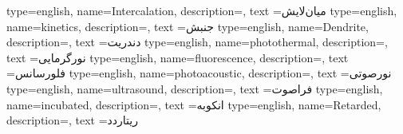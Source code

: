 {
    type=english,
    name={Intercalation},
    description={},
    text ={میان‌لایش}
}
{
    type=english,
    name={kinetics},
    description={},
    text ={جنبش}
}
{
    type=english,
    name={Dendrite},
    description={},
    text ={دندریت}
}
{
    type=english,
    name={photothermal},
    description={},
    text ={نورگرمایی}
}
{
    type=english,
    name={fluorescence},
    description={},
    text ={فلورسانس}
}
{
    type=english,
    name={photoacoustic},
    description={},
    text ={نورصوتی}
}
{
    type=english,
    name={ultrasound},
    description={},
    text ={فراصوت}
}
{
    type=english,
    name={incubated},
    description={},
    text ={انکوبه}
}
{
    type=english,
    name={Retarded},
    description={},
    text ={ریتاردد}
}